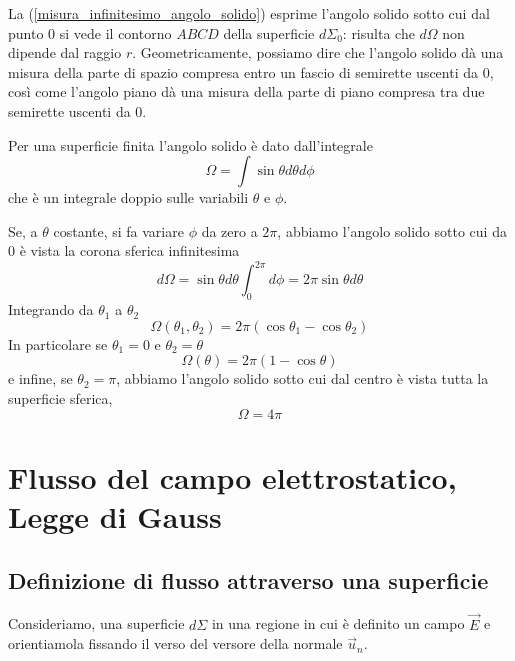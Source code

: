 \documentclass[class=book, crop=false, oneside, 12pt]{standalone}
\begin{document}
La (\ref{misura_infinitesimo_angolo_solido}) esprime l'angolo solido sotto cui dal punto \(0\) si vede il contorno \(ABCD\) della superficie \(d \Sigma_0\): 
risulta che \(d \Omega\) non dipende dal raggio \(r\). 
Geometricamente, possiamo dire che l'angolo solido dà una misura della parte di spazio compresa entro un fascio di semirette uscenti da \(0\), così come l'angolo piano dà una misura della parte di piano compresa tra due semirette uscenti da \(0\).

Per una superficie finita l'angolo solido è dato dall'integrale
\begin{equation}
    \Omega = \int \sin \theta d \theta d \phi
\end{equation}
che è un integrale doppio sulle variabili \(\theta\) e \(\phi\).

Se, a \(\theta\) costante, si fa variare \(\phi\) da zero a \(2 \pi\), abbiamo l'angolo solido sotto cui da \(0\) è vista la corona sferica infinitesima
\begin{equation}
    d \Omega = \sin \theta d \theta \int_0^{2 \pi} d \phi = 2 \pi \sin \theta d \theta
\end{equation}
Integrando da \(\theta_1\) a \(\theta_2\)
\begin{equation*}
    \Omega (\theta_1 , \theta_2) = 2 \pi \left(\cos \theta_1 - \cos \theta_2 \right)
\end{equation*}
In particolare se \(\theta_1 = 0\) e \(\theta_2 = \theta\)
\begin{equation}
    \Omega (\theta) = 2 \pi (1- \cos \theta)
\end{equation}
e infine, se \(\theta_2 = \pi\), abbiamo l'angolo solido sotto cui dal centro è vista tutta la superficie sferica, 
\begin{equation}
    \Omega = 4 \pi
\end{equation}

\section{Flusso del campo elettrostatico, Legge di Gauss}

\subsection{Definizione di flusso attraverso una superficie}

Consideriamo, una superficie \( d \Sigma\) in una regione in cui è definito un campo \(\overrightarrow{E}\) e orientiamola fissando il verso del versore della normale \(\overrightarrow{u}_n\). 
\end{document}
